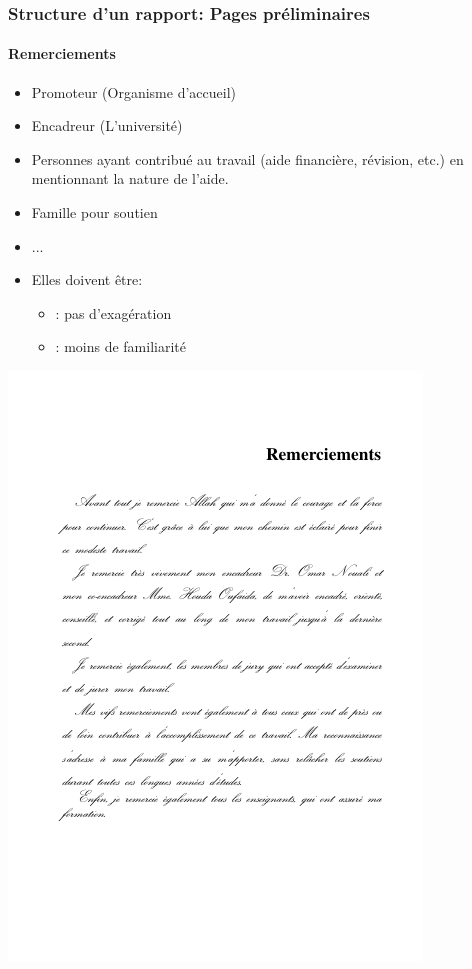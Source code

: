 \documentclass[xcolor=table]{beamer}
\begin{document}
\begin{frame}
\frametitle{Structure d'un rapport: Pages préliminaires}
\framesubtitle{Remerciements}

\begin{minipage}{0.60\textwidth}
	\begin{itemize}
		\item Promoteur (Organisme d'accueil)
		\item Encadreur (L'université)
		\item Personnes ayant contribué au travail (aide financière, révision, etc.) en mentionnant la nature de l'aide.
		\item Famille pour soutien
		\item ...
		\item Elles doivent être:
		\begin{itemize}
			\item {}: pas d'exagération
			\item {}: moins de familiarité
		\end{itemize}
	\end{itemize}
\end{minipage}
\begin{minipage}{0.38\textwidth}
	\includegraphics[width=\textwidth,frame]{..//img/Bweb03-redaction/remerciements.png}
\end{minipage}

\end{frame}
\end{document}
